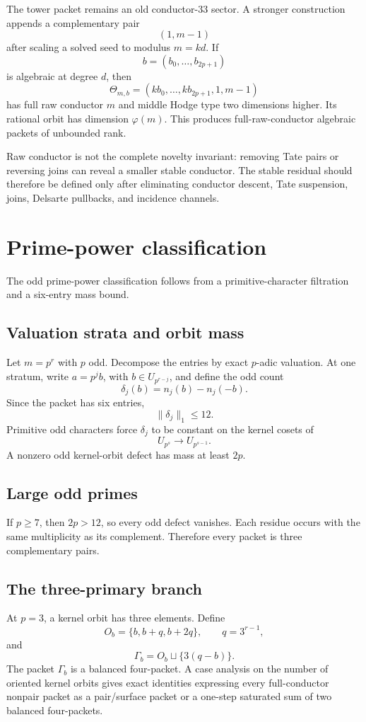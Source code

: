 \documentclass[11pt,oneside]{book}
\theoremstyle{definition}
\theoremstyle{remark}
\begin{document}
The tower packet remains an old conductor-33 sector. A stronger construction appends a complementary pair
\[
(1,m-1)
\]
after scaling a solved seed to modulus \(m=kd\). If
\[
b=(b_0,\ldots,b_{2p+1})
\]
is algebraic at degree \(d\), then
\[
\Theta_{m,b}=(kb_0,\ldots,kb_{2p+1},1,m-1)
\]
has full raw conductor \(m\) and middle Hodge type two dimensions higher. Its rational orbit has dimension \(\varphi(m)\). This produces full-raw-conductor algebraic packets of unbounded rank.

Raw conductor is not the complete novelty invariant: removing Tate pairs or reversing joins can reveal a smaller stable conductor. The stable residual should therefore be defined only after eliminating conductor descent, Tate suspension, joins, Delsarte pullbacks, and incidence channels.

\chapter{Prime-power classification}
The odd prime-power classification follows from a primitive-character filtration and a six-entry mass bound.

\section{Valuation strata and orbit mass}
Let \(m=p^r\) with \(p\) odd. Decompose the entries by exact \(p\)-adic valuation. At one stratum, write \(a=p^jb\), with \(b\in U_{p^{r-j}}\), and define the odd count
\[
\delta_j(b)=n_j(b)-n_j(-b).
\]
Since the packet has six entries,
\[
\|\delta_j\|_1\le 12.
\tag{12.1}
\]
Primitive odd characters force \(\delta_j\) to be constant on the kernel cosets of
\[
U_{p^s}\to U_{p^{s-1}}.
\]
A nonzero odd kernel-orbit defect has mass at least \(2p\).

\section{Large odd primes}
If \(p\ge7\), then \(2p>12\), so every odd defect vanishes. Each residue occurs with the same multiplicity as its complement. Therefore every packet is three complementary pairs.

\section{The three-primary branch}
At \(p=3\), a kernel orbit has three elements. Define
\[
O_b=\{b,b+q,b+2q\},
\qquad q=3^{r-1},
\]
and
\[
\Gamma_b=O_b\sqcup\{3(q-b)\}.
\]
The packet \(\Gamma_b\) is a balanced four-packet. A case analysis on the number of oriented kernel orbits gives exact identities expressing every full-conductor nonpair packet as a pair/surface packet or a one-step saturated sum of two balanced four-packets.
\end{document}
